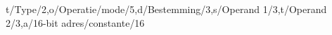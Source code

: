 \begin{bitstructure}{t/Type/2,o/{Operatie/mode}/5,d/Bestemming/3,s/Operand 1/3,t/Operand 2/3,a/{16-bit adres/constante}/16}

\end{bitstructure}